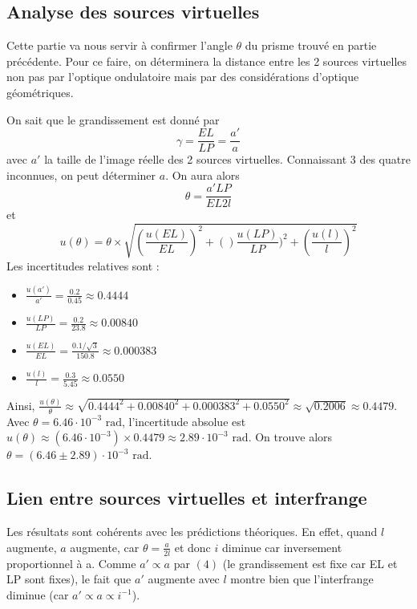 \documentclass[a4paper,10pt,french]{scrartcl}
\begin{document}
\subsection{Analyse des sources virtuelles}
Cette partie va nous servir à confirmer l'angle \(\theta\) du prisme trouvé en partie précédente. Pour ce faire, on déterminera la distance entre les 2 sources virtuelles non pas par l'optique ondulatoire mais par des considérations d'optique géométriques.

On sait que le grandissement est donné par \begin{equation}
                                            \gamma = \frac{EL}{LP} = \frac{a'}{a}
                                           \end{equation} avec \(a'\) la taille de l'image réelle des 2 sources virtuelles.
Connaissant 3 des quatre inconnues, on peut déterminer \(a\). On aura alors \begin{equation}
                                                                             \theta = \frac{a'LP}{EL2l}
                                                                            \end{equation}
et \[u(\theta) = \theta \times \sqrt{(\frac{u(EL)}{EL})^2 + ()\frac{u(LP)}{LP})^2 + (\frac{u(l)}{l})^2} \]
Les incertitudes relatives sont :
\begin{itemize}
    \item $\frac{u(a')}{a'} = \frac{0.2}{0.45} \approx 0.4444$
    \item $\frac{u(LP)}{LP} = \frac{0.2}{23.8} \approx 0.00840$
    \item $\frac{u(EL)}{EL} = \frac{0.1/\sqrt{3}}{150.8} \approx 0.000383$
    \item $\frac{u(l)}{l} = \frac{0.3}{5.45} \approx 0.0550$
\end{itemize}
Ainsi, $\frac{u(\theta)}{\theta} \approx \sqrt{0.4444^2 + 0.00840^2 + 0.000383^2 + 0.0550^2} \approx \sqrt{0.2006} \approx 0.4479$.
Avec $\theta = 6.46\cdot 10^{-3}\text{ rad}$, l'incertitude absolue est $u(\theta) \approx (6.46\cdot 10^{-3}) \times 0.4479 \approx 2.89\cdot 10^{-3}\text{ rad}$.
On trouve alors $\theta = (6.46 \pm 2.89)\cdot 10^{-3}\text{ rad}$.
\subsection{Lien entre sources virtuelles et interfrange}
Les résultats sont cohérents avec les prédictions théoriques. En effet, quand \(l\) augmente, \(a\) augmente, car \(\theta = \frac{a}{2l}\) et donc \(i\) diminue car inversement proportionnel à a. Comme \(a'\propto a\) par \((4)\) (le grandissement est fixe car EL et LP sont fixes), le fait que \(a'\) augmente avec \(l\) montre bien que l'interfrange diminue (car \(a'\propto a \propto i^{-1}\)).
\end{document}

